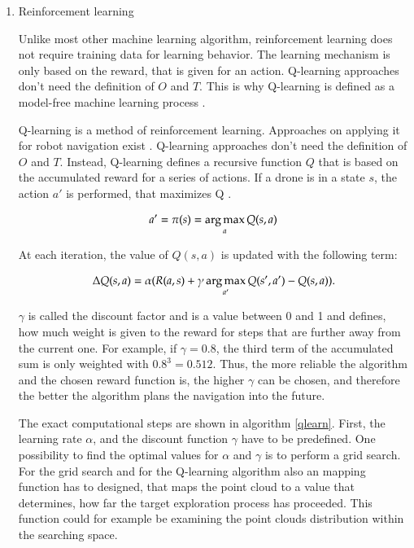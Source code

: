 	\begin{enumerate}
	
	\item{Reinforcement learning}
	
	Unlike most other machine learning algorithm, reinforcement learning does not require training data for learning behavior. The learning mechanism is only based 
	on the reward, that is given for an action. %
	Q-learning approaches don't need the definition of $O$ and $T$. This is why Q-learning is defined as a model-free machine learning process \cite{deep}. 
	
	Q-learning is a method of reinforcement learning. Approaches on applying it for robot navigation exist \cite{accurat}\cite{deep}\cite{lopez}. Q-learning approaches don't need the definition of $O$ and $T$.
	Instead, Q-learning defines a recursive function $Q$ that is based on the accumulated reward for a series of actions. If a drone is in a state $s$, the action $a'$ is performed, 
	that maximizes Q \cite{lopez}. 
	
	$$a' = \pi(s) = \mathop{\mathrm{arg\,max}}_{a} Q(s,a)$$
	
	At each iteration, the value of $Q(s,a)$ is updated with the following term: 
	
	\begin{equation}\label{update}
    \Delta Q(s,a) = \alpha(R(a,s) + 	\gamma \mathop{\mathrm{arg\,max}}_{a'}Q(s', a') - Q(s, a)).
	\end{equation}
	
	$\gamma$ is called the discount factor and is a value between 0 and 1 and defines, how much weight is given to the reward for steps that are further away from the current one. 
	For example, if $\gamma = 0.8$, the third term of the accumulated sum is only weighted with ${0.8}^3 = 0.512$. Thus, the more reliable the algorithm 
	and the chosen reward function is, the higher $\gamma$ can be chosen, and therefore the better the algorithm plans the navigation into the future. 
	
	The exact computational steps are shown in algorithm \ref{qlearn}. 
	First, the learning rate $\alpha$, and the discount function $\gamma$ have to be predefined. One possibility to find the optimal values for $\alpha$ and 
    $\gamma$ is to perform a grid search. For the grid search and for the Q-learning algorithm also an mapping function has to designed, that maps 
	the point cloud to a value that determines, how far the target exploration process has proceeded. This function could for example be examining the point clouds 
	distribution within the searching space. 
	

\end{enumerate}

